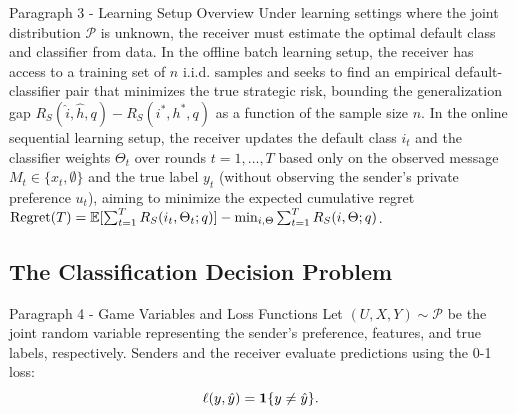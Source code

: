 \begin{faqblock}
\faqanswers
{}
\end{faqblock}

\begin{sourceblock}{Paragraph 3 - Learning Setup Overview}
Under learning settings where the joint distribution $\mathcal{P}$ is unknown, the receiver must estimate the optimal default class and classifier from data. In the offline batch learning setup, the receiver has access to a training set of $n$ i.i.d. samples and seeks to find an empirical default-classifier pair that minimizes the true strategic risk, bounding the generalization gap $R_S(\hat{i}, \hat{h}, q) - R_S(i^*, h^*, q)$ as a function of the sample size $n$. In the online sequential learning setup, the receiver updates the default class $i_t$ and the classifier weights $\Theta_t$ over rounds $t=1,\dots,T$ based only on the observed message $M_t \in \{x_t, \emptyset\}$ and the true label $y_t$ (without observing the sender's private preference $u_t$), aiming to minimize the expected cumulative regret $\text{Regret}(T) = \mathbb{E}[\sum_{t=1}^T R_S(i_t, \Theta_t; q)] - \min_{i, \Theta} \sum_{t=1}^T R_S(i, \Theta; q)$.
\end{sourceblock}

\begin{faqblock}
\faqanswers
{}
\end{faqblock}

\subsection{The Classification Decision Problem}
\label{sec:classification_decision}

\begin{sourceblock}{Paragraph 4 - Game Variables and Loss Functions}
Let $(U, X, Y) \sim \mathcal{P}$ be the joint random variable representing the sender's preference, features, and true labels, respectively. Senders and the receiver evaluate predictions using the 0-1 loss:
\begin{equation}
    \ell(y, \hat{y}) = \mathbf{1}\{y \ne \hat{y}\}.
\end{equation}
\end{sourceblock}

